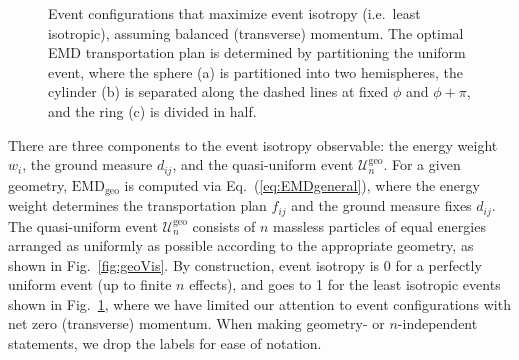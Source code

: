 \documentclass[letterpaper,11pt]{article}
\DeclareRobustCommand{\Fig}[1]{Fig.~\ref{#1}}
\DeclareRobustCommand{\Eq}[1]{Eq.~(\ref{#1})}
\begin{document}
\begin{figure}[t!]
%
    \hfill
{}
    \hfill
    \hfill
    \qquad
%
\caption{Event configurations that maximize event isotropy (i.e.\ least isotropic), assuming balanced (transverse) momentum.
%
The optimal EMD transportation plan is determined by partitioning the uniform event, where the sphere (a) is partitioned into two hemispheres, the cylinder (b) is separated along the dashed lines at fixed $\phi$ and $\phi+\pi$, and the ring (c) is divided in half.}
%
\label{fig:dijets}
%
\end{figure}



There are three components to the event isotropy observable:  the energy weight $w_i$, the ground measure $d_{ij}$, and the quasi-uniform event $ \mathcal{U}^\text{geo}_n$.
%
For a given geometry, $\text{EMD}_\text{geo}$ is computed via \Eq{eq:EMDgeneral}, where the energy weight determines the transportation plan $f_{ij}$ and the ground measure fixes $d_{ij}$.
%
The quasi-uniform event $\mathcal{U}_n^\text{geo}$ consists of $n$ massless particles of equal energies arranged as uniformly as possible according to the appropriate geometry, as shown in \Fig{fig:geoVis}.
%
By construction, event isotropy is 0 for a perfectly uniform event (up to finite $n$ effects), and goes to 1 for the least isotropic events shown in \Fig{fig:dijets}, where we have limited our attention to event configurations with net zero (transverse) momentum.
%
When making geometry- or $n$-independent statements, we drop the labels for ease of notation.
\end{document}
